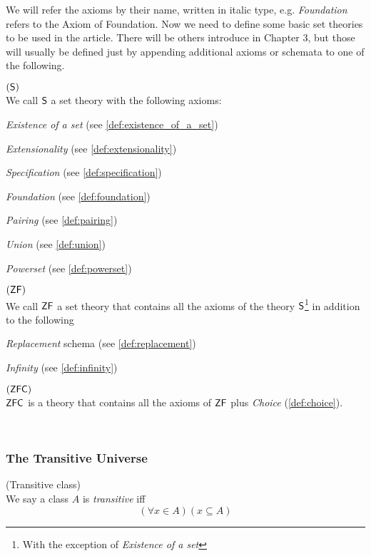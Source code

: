 We will refer the axioms by their name, written in italic type, e.g. \emph{Foundation} refers to the Axiom of Foundation. Now we need to define some basic set theories to be used in the article. There will be others introduce in Chapter 3, but those will usually be defined just by appending additional axioms or schemata to one of the following.

\begin{definition}{$(\sf{S})$}\label{def:s}\\
We call $\sf{S}$ a set theory with the following axioms:
\bce[(i)]
\item \emph{Existence of a set} (see \ref{def:existence_of_a_set})
\item \emph{Extensionality} (see \ref{def:extensionality})
\item \emph{Specification} (see \ref{def:specification})
\item \emph{Foundation} (see \ref{def:foundation})
\item \emph{Pairing} (see \ref{def:pairing})
\item \emph{Union} (see \ref{def:union})
\item \emph{Powerset} (see \ref{def:powerset})
\ece
\end{definition}

\begin{definition}{$(\sf{ZF})$}\label{def:zf}\\
We call $\sf{ZF}$ a set theory that contains all the axioms of the theory $\sf{S}$\footnote{With the exception of \emph{Existence of a set}} in addition to the following
\bce[(i)]
\item \emph{Replacement} schema (see \ref{def:replacement})
\item \emph{Infinity} (see \ref{def:infinity})
\ece
\end{definition}

\begin{definition}{$(\sf{ZFC})$}\label{def:zfc}\\
$\sf{ZFC}$ is a theory that contains all the axioms of $\sf{ZF}$ plus \emph{Choice} (\ref{def:choice}).
\end{definition}

\

\subsubsection{The Transitive Universe}
\begin{definition}{(Transitive class)}\label{def:transitivity}\\
We say a class $A$ is \emph{transitive} iff
\begin{equation}
(\forall x \in A)(x \subseteq A)
\end{equation}
\end{definition}

